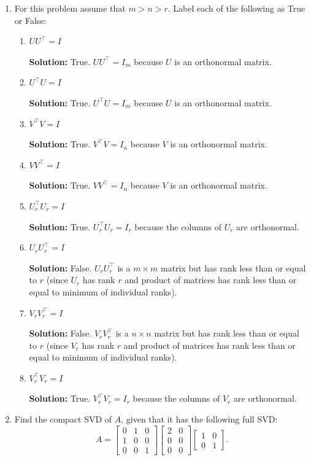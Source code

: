 \documentclass[10pt]{article}
\begin{document}
\begin{enumerate}[label=(\alph*)]
\item For this problem assume that $m > n > r$. Label each of the following as True or False:

\begin{enumerate}[label=(\alph*)]
    \item $UU^\top = I$

    \textbf{Solution:} True. $UU^\top = I_m$ because $U$ is an orthonormal matrix.

    \item $U^\top U = I$

    \textbf{Solution:} True. $U^\top U = I_m$ because $U$ is an orthonormal matrix.

    \item $V^\top V = I$

    \textbf{Solution:} True. $V^\top V = I_n$ because $V$ is an orthonormal matrix.

    \item $VV^\top = I$

    \textbf{Solution:} True. $VV^\top = I_n$ because $V$ is an orthonormal matrix.

    \item $U_r^\top U_r = I$

    \textbf{Solution:} True. $U_r^\top U_r = I_r$ because the columns of $U_r$ are orthonormal.

    \item $U_r U_r^\top = I$

    \textbf{Solution:} False. $U_r U_r^\top$ is a $m \times m$ matrix but has rank less than or equal to $r$ (since $U_r$ has rank $r$ and product of matrices has rank less than or equal to minimum of individual ranks).

    \item $V_r V_r^\top = I$

    \textbf{Solution:} False. $V_r V_r^\top$ is a $n \times n$ matrix but has rank less than or equal to $r$ (since $V_r$ has rank $r$ and product of matrices has rank less than or equal to minimum of individual ranks).

    \item $V_r^\top V_r = I$

    \textbf{Solution:} True. $V_r^\top V_r = I_r$ because the columns of $V_r$ are orthonormal.
\end{enumerate}

\item Find the compact SVD of $A$, given that it has the following full SVD:
\[
A = \begin{bmatrix} 0 & 1 & 0 \\ 1 & 0 & 0 \\ 0 & 0 & 1 \end{bmatrix} \begin{bmatrix} 2 & 0 \\ 0 & 0 \\ 0 & 0 \end{bmatrix} \begin{bmatrix} 1 & 0 \\ 0 & 1 \end{bmatrix}.
\]


\end{enumerate}
\end{document}
